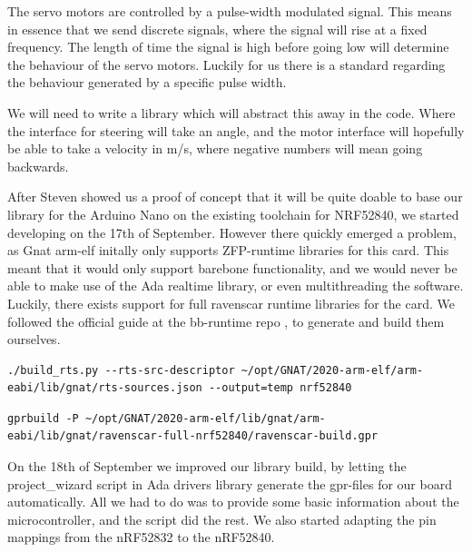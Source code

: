 \documentclass{article}
\begin{document}
The servo motors are controlled by a pulse-width modulated signal. This means in essence that we send discrete signals, where the signal will rise at a fixed frequency. The length of time the signal is high before going low will determine the behaviour of the servo motors. Luckily for us there is a standard regarding the behaviour generated by a specific pulse width. 

We will need to write a library which will abstract this away in the code. Where the interface for steering will take an angle, and the motor interface will hopefully be able to take a velocity in m/s, where negative numbers will mean going backwards.

\vspace{5mm}
After Steven showed us a proof of concept that it will be quite doable to base our library for the Arduino Nano on the existing toolchain for NRF52840, we started developing on the 17th of September. However there quickly emerged a problem, as Gnat arm-elf initally only supports ZFP-runtime libraries for this card. This meant that it would only support barebone functionality, and we would never be able to make use of the Ada realtime library, or even multithreading the software. Luckily, there exists support for full ravenscar runtime libraries for the card. We followed the official guide at the bb-runtime repo \cite{BBRUNTIMES}, to generate and build them ourselves.


\begin{lstlisting}
./build_rts.py --rts-src-descriptor ~/opt/GNAT/2020-arm-elf/arm-eabi/lib/gnat/rts-sources.json --output=temp nrf52840
\end{lstlisting}

\begin{lstlisting}
gprbuild -P ~/opt/GNAT/2020-arm-elf/lib/gnat/arm-eabi/lib/gnat/ravenscar-full-nrf52840/ravenscar-build.gpr
\end{lstlisting}


\vspace{5mm}
On the 18th of September we improved our library build, by letting the project\_wizard script in Ada drivers library generate the gpr-files for our board automatically. All we had to do was to provide some basic information about the microcontroller, and the script did the rest. We also started adapting the pin mappings from the nRF52832 to the nRF52840. 
\end{document}
